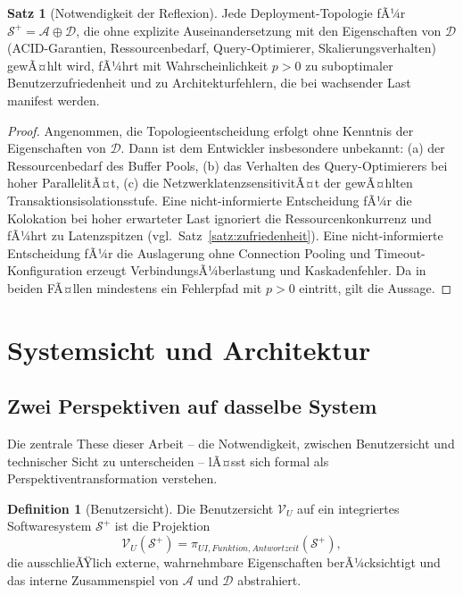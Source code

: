 ﻿\documentclass[a4paper,12pt]{article}
\theoremstyle{definition}
\newtheorem{definition}{Definition}
\newtheorem{satz}{Satz}
\begin{document}
\begin{satz}[Notwendigkeit der Reflexion]
\label{satz:reflexion}
Jede Deployment-Topologie fÃ¼r $\mathcal{S}^+ = \mathcal{A} \oplus \mathcal{D}$, die ohne explizite Auseinandersetzung mit den Eigenschaften von $\mathcal{D}$ (ACID-Garantien, Ressourcenbedarf, Query-Optimierer, Skalierungsverhalten) gewÃ¤hlt wird, fÃ¼hrt mit Wahrscheinlichkeit $p > 0$ zu suboptimaler Benutzerzufriedenheit und zu Architekturfehlern, die bei wachsender Last manifest werden.
\end{satz}

\begin{proof}
Angenommen, die Topologieentscheidung erfolgt ohne Kenntnis der Eigenschaften von $\mathcal{D}$. Dann ist dem Entwickler insbesondere unbekannt: (a) der Ressourcenbedarf des Buffer Pools, (b) das Verhalten des Query-Optimierers bei hoher ParallelitÃ¤t, (c) die NetzwerklatenzsensitivitÃ¤t der gewÃ¤hlten Transaktionsisolationsstufe. Eine nicht-informierte Entscheidung fÃ¼r die Kolokation bei hoher erwarteter Last ignoriert die Ressourcenkonkurrenz und fÃ¼hrt zu Latenzspitzen (vgl.\ Satz~\ref{satz:zufriedenheit}). Eine nicht-informierte Entscheidung fÃ¼r die Auslagerung ohne Connection Pooling und Timeout-Konfiguration erzeugt VerbindungsÃ¼berlastung und Kaskadenfehler. Da in beiden FÃ¤llen mindestens ein Fehlerpfad mit $p > 0$ eintritt, gilt die Aussage.
\end{proof}

\section{Systemsicht und Architektur}
\label{sec:architektur}

\subsection{Zwei Perspektiven auf dasselbe System}

Die zentrale These dieser Arbeit -- die Notwendigkeit, zwischen Benutzersicht und technischer Sicht zu unterscheiden -- lÃ¤sst sich formal als Perspektiventransformation verstehen.

\begin{definition}[Benutzersicht]
\label{def:benutzersicht}
Die Benutzersicht $\mathcal{V}_U$ auf ein integriertes Softwaresystem $\mathcal{S}^+$ ist die Projektion
\[
\mathcal{V}_U(\mathcal{S}^+) = \pi_{\mathit{UI}, \mathit{Funktion}, \mathit{Antwortzeit}}(\mathcal{S}^+),
\]
die ausschlieÃŸlich externe, wahrnehmbare Eigenschaften berÃ¼cksichtigt und das interne Zusammenspiel von $\mathcal{A}$ und $\mathcal{D}$ abstrahiert.
\end{definition}
\end{document}
